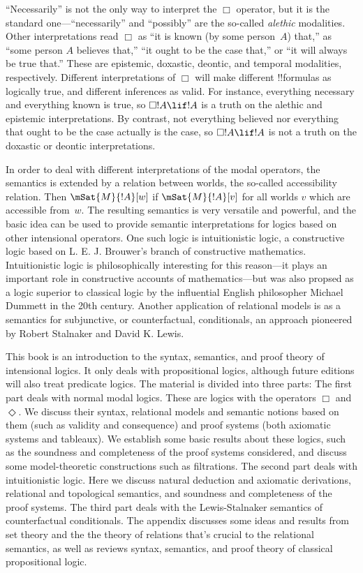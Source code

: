 ``Necessarily'' is not the only way to interpret the $\Box$ operator,
but it is the standard one---``necessarily'' and ``possibly'' are the
so-called \emph{alethic} modalities. Other interpretations read $\Box$
as ``it is known (by some person~$A$) that,'' as ``some person $A$
believes that,'' ``it ought to be the case that,'' or ``it will always
be true that.'' These are epistemic, doxastic, deontic, and temporal
modalities, respectively. Different interpretations of $\Box$ will
make different !!{formula}s as logically true, and different
inferences as valid. For instance, everything necessary and everything
known is true, so $\Box !A \lif !A$ is a truth on the alethic and
epistemic interpretations. By contrast, not everything believed nor
everything that ought to be the case actually is the case, so $\Box !A
\lif !A$ is not a truth on the doxastic or deontic interpretations. 

In order to deal with different interpretations of the modal
operators, the semantics is extended by a relation between worlds, the
so-called accessibility relation.  Then $\mSat{M}{!A}[w]$ if
$\mSat{M}{!A}[v]$ for all worlds $v$ which are accessible from~$w$.
The resulting semantics is very versatile and powerful, and the basic
idea can be used to provide semantic interpretations for logics based
on other intensional operators. One such logic is intuitionistic
logic, a constructive logic based on L. E. J. Brouwer's branch of
constructive mathematics. Intuitionistic logic is philosophically
interesting for this reason---it plays an important role in
constructive accounts of mathematics---but was also propsed as a logic
superior to classical logic by the influential English philosopher
Michael Dummett in the 20th century. Another application of relational
models is as a semantics for subjunctive, or counterfactual,
conditionals, an approach pioneered by Robert Stalnaker and David K.
Lewis.

This book is an introduction to the syntax, semantics, and proof
theory of intensional logics. It only deals with propositional logics,
although future editions will also treat predicate logics.  The
material is divided into three parts: The first part deals with normal
modal logics. These are logics with the operators $\Box$ and
$\Diamond$. We discuss their syntax, relational models and semantic
notions based on them (such as validity and consequence) and proof
systems (both axiomatic systems and tableaux). We establish some
basic results about these logics, such as the soundness and
completeness of the proof systems considered, and discuss some
model-theoretic constructions such as filtrations. The second part
deals with intuitionistic logic. Here we discuss natural deduction and
axiomatic derivations, relational and topological semantics, and
soundness and completeness of the proof systems. The third part deals
with the Lewis-Stalnaker semantics of counterfactual conditionals. 
The appendix discusses some ideas and results from set theory
and the the theory of relations that's crucial to the relational
semantics, as well as reviews syntax, semantics, and proof theory of
classical propositional logic.